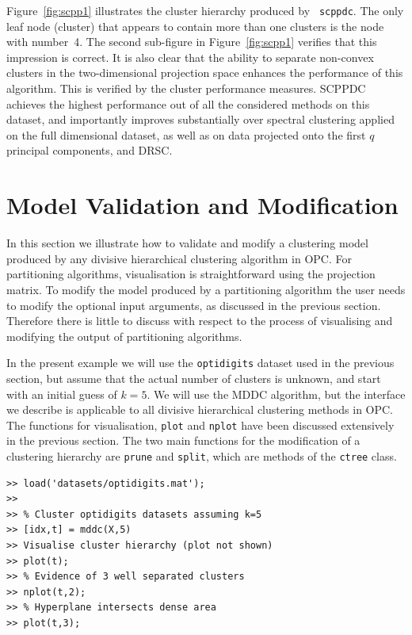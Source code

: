\documentclass{book}
\begin{document}
\noindent
%
Figure~\ref{fig:scpp1} illustrates the cluster hierarchy produced by {\tt
scppdc}.
%
%
The only leaf node (cluster) that appears to contain more than one clusters is
the node with number~4. The second sub-figure in Figure~\ref{fig:scpp1}
verifies that this impression is correct. It is also clear that the ability to
separate non-convex clusters in the two-dimensional projection space
enhances the performance of this algorithm.
%
This is verified by the cluster performance measures. SCPPDC achieves the
highest performance out of all the considered methods on this dataset, and
importantly improves substantially over spectral clustering applied on the full
dimensional dataset, as well as on data projected onto the first $q$ principal
components, and DRSC.







\chapter{Model Validation and Modification}\label{sec:valid}

In this section we illustrate how to validate and modify a clustering model
produced by any divisive hierarchical clustering algorithm in OPC.
%
For partitioning algorithms, visualisation is straightforward using the
projection matrix. To modify the model produced by a partitioning algorithm the
user needs to modify the optional input arguments, as discussed in the previous
section.
%
Therefore there is little to discuss with respect to the process of visualising
and modifying the output of partitioning algorithms.

In the present example we will use the {\tt optidigits} dataset used in the
previous section, but assume that the actual number of clusters is unknown,
and start with an initial guess of $k=5$.
%
We will use the MDDC algorithm, but the interface we describe is applicable to
all divisive hierarchical clustering methods in OPC.
%
The functions for visualisation, {\tt plot} and {\tt nplot}
have been discussed extensively in the previous
section.
The two main functions for the modification of a clustering hierarchy are
{\tt prune} and {\tt split}, which are methods of the {\tt ctree} class.

\begin{verbatim}
>> load('datasets/optidigits.mat');
>>
>> % Cluster optidigits datasets assuming k=5
>> [idx,t] = mddc(X,5)
>> Visualise cluster hierarchy (plot not shown)
>> plot(t);
>> % Evidence of 3 well separated clusters
>> nplot(t,2);
>> % Hyperplane intersects dense area
>> plot(t,3);
\end{verbatim}
\end{document}
